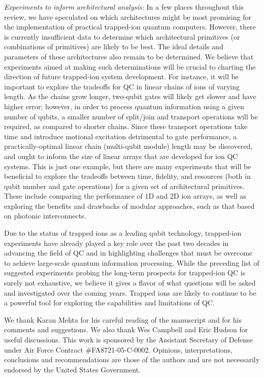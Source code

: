 \documentclass[%
12pt,
 amsmath,amssymb,
]{revtex4-2}
\begin{document}
\textit{Experiments to inform architectural analysis:} In a few places throughout this review, we have speculated on which architectures might be most promising for the implementation of practical trapped-ion quantum computers.  However, there is currently insufficient data to determine which architectural primitives (or combinations of primitives) are likely to be best.  The ideal details and parameters of these architectures also remain to be determined.  We believe that experiments aimed at making such determinations will be crucial to charting the direction of future trapped-ion system development.  For instance, it will be important to explore the tradeoffs for QC in linear chains of ions of varying length.  As the chains grow longer, two-qubit gates will likely get slower and have higher error; however, in order to process quantum information using a given number of qubits, a smaller number of split/join and transport operations will be required, as compared to shorter chains.  Since these transport operations take time and introduce motional excitation detrimental to gate performance, a practically-optimal linear chain (multi-qubit module) length may be discovered, and ought to inform the size of linear arrays that are developed for ion QC systems.  This is just one example, but there are many experiments that will be beneficial to explore the tradeoffs between time, fidelity, and resources (both in qubit number and gate operations) for a given set of architectural primitives.  These include comparing the performance of 1D and 2D ion arrays, as well as exploring the benefits and drawbacks of modular approaches, such as that based on photonic interconnects.

Due to the status of trapped ions as a leading qubit technology, trapped-ion experiments have already played a key role over the past two decades in advancing the field of QC and in highlighting challenges that must be overcome to achieve large-scale quantum information processing. While the preceding list of suggested experiments probing the long-term prospects for trapped-ion QC is surely not exhaustive, we believe it gives a flavor of what questions will be asked and investigated over the coming years. Trapped ions are likely to continue to be a powerful tool for exploring the capabilities and limitations of QC.

\begin{acknowledgments}
We thank Karan Mehta for his careful reading of the manuscript and for his comments and suggestions.  We also thank Wes Campbell and Eric Hudson for useful discussions.  This work is sponsored by the Assistant Secretary of Defense under Air Force Contract $\#$FA8721-05-C-0002. Opinions, interpretations, conclusions and recommendations are those of the authors and are not necessarily endorsed by the United States Government.
\end{acknowledgments}



\end{document}
